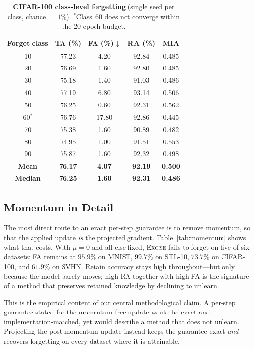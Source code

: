 \documentclass{article}
\newcommand{\ours}{\textsc{Excise}}
\theoremstyle{remark}
\theoremstyle{plain}
\begin{document}
\begin{table}[t]
\centering
\caption{\textbf{CIFAR-100 class-level forgetting} (single seed per class,
chance $=1\%$). $^*$Class~60 does not converge within the 20-epoch budget.}
\label{tab:cifar100}
\begin{tabular}{@{}ccccc@{}}
\toprule
Forget class & TA (\%) & FA (\%)$\downarrow$ & RA (\%) & MIA \\
\midrule
10 & 77.23 & 4.20 & 92.84 & 0.485 \\
20 & 76.69 & 1.60 & 92.80 & 0.485 \\
30 & 75.18 & 1.40 & 91.03 & 0.486 \\
40 & 77.19 & 6.80 & 93.14 & 0.506 \\
50 & 76.25 & 0.60 & 92.31 & 0.562 \\
60$^*$ & 76.76 & 17.80 & 92.86 & 0.445 \\
70 & 75.38 & 1.60 & 90.89 & 0.482 \\
80 & 74.95 & 1.00 & 91.51 & 0.553 \\
90 & 75.87 & 1.60 & 92.32 & 0.498 \\
\midrule
\textbf{Mean} & \textbf{76.17} & \textbf{4.07} & \textbf{92.19} & \textbf{0.500} \\
\textbf{Median} & \textbf{76.25} & \textbf{1.60} & \textbf{92.31} & \textbf{0.486} \\
\bottomrule
\end{tabular}
\end{table}

\subsection{Momentum in Detail}\label{app:momentum}

The most direct route to an exact per-step guarantee is to remove momentum, so
that the applied update \emph{is} the projected gradient. Table~\ref{tab:momentum}
shows what that costs. With $\mu=0$ and all else fixed, \ours{} fails to forget
on five of six datasets: FA remains at $95.9\%$ on MNIST, $99.7\%$ on STL-10,
$73.7\%$ on CIFAR-100, and $61.9\%$ on SVHN. Retain accuracy stays high
throughout---but only because the model barely moves; high RA together with high
FA is the signature of a method that preserves retained knowledge by declining
to unlearn.

This is the empirical content of our central methodological claim. A per-step
guarantee stated for the momentum-free update would be exact and
implementation-matched, yet would describe a method that does not unlearn.
Projecting the post-momentum update instead keeps the guarantee exact
\emph{and} recovers forgetting on every dataset where it is attainable.
\end{document}
